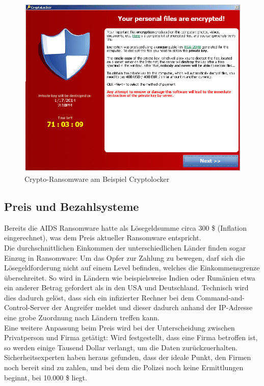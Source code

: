 \begin{figure}[h!]
	\centering
	\includegraphics[width=\textwidth]{img/cryptolocker.png}
	\caption{Crypto-Ransomware am Beispiel \glqq Cryptolocker\grqq\cite{evolution}}
	\label{fig:cryptolocker}
\end{figure}


\subsection{Preis und Bezahlsysteme}

Bereits die AIDS Ransomware hatte als Lösegeldsumme circa 300 \$ (Inflation eingerechnet), was dem Preis aktueller Ransomware entspricht\cite{evolution}.\\ 
Die durchschnittlichen Einkommen der unterschiedlichen Länder finden sogar Einzug in Ransomware: Um das Opfer zur Zahlung zu bewegen, darf sich die Lösegeldforderung nicht auf einem Level befinden, welches die Einkommensgrenze überschreitet. So wird in Ländern wie beispielsweise Indien oder Rumänien etwa ein anderer Betrag gefordert als in den USA und Deutschland. Technisch wird dies dadurch gelöst, dass sich ein infizierter Rechner bei dem Command-and-Control-Server der Angreifer meldet und dieser dadurch anhand der IP-Adresse eine grobe Zuordnung nach Ländern treffen kann.\\

Eine weitere Anpassung beim Preis wird bei der Unterscheidung zwischen Privatperson und Firma getätigt: Wird festgestellt, dass eine Firma betroffen ist, so werden einige Tausend Dollar verlangt, um die Daten zurückzuerhalten. Sicherheitsexperten haben heraus gefunden, dass der ideale Punkt, den Firmen noch bereit sind zu zahlen, und bei dem die Polizei noch keine Ermittlungen beginnt, bei 10.000 \$ liegt\cite{sweetspot}.\\

